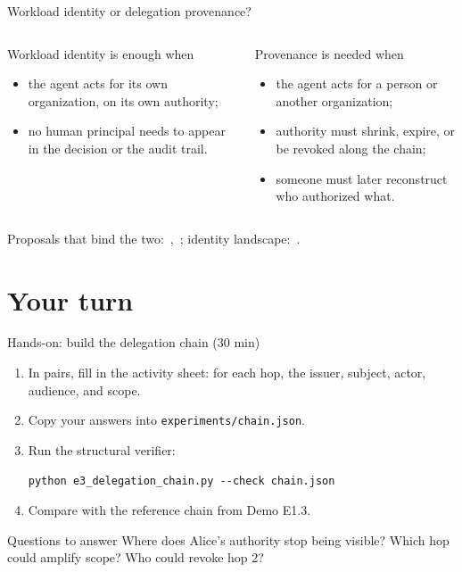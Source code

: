 \documentclass[aspectratio=169, 10pt]{beamer}
\begin{document}
\begin{frame}{Workload identity or delegation provenance?}
  \begin{columns}[T]
    \begin{exampleblock}{Workload identity is enough when}\small
      \begin{itemize}
        \item the agent acts for its own organization, on its own authority;
        \item no human principal needs to appear in the decision or the audit trail.
      \end{itemize}
    \end{exampleblock}
    \begin{alertblock}{Provenance is needed when}\small
      \begin{itemize}
        \item the agent acts for a person or another organization;
        \item authority must shrink, expire, or be revoked along the chain;
        \item someone must later reconstruct who authorized what.
      \end{itemize}
    \end{alertblock}
  \end{columns}
  \vspace{2mm}
  {\small Proposals that bind the two: \,\pre, \,\pre; identity landscape: \,\pre.}
\end{frame}

\section{Your turn}

\begin{frame}[fragile]{Hands-on: build the delegation chain (30 min)}
  \small
  \begin{enumerate}
    \item In pairs, fill in the activity sheet: for each hop, the issuer, subject, actor, audience, and scope.
    \item Copy your answers into \texttt{experiments/chain.json}.
    \item Run the structural verifier:
\begin{verbatim}
python e3_delegation_chain.py --check chain.json
\end{verbatim}
    \item Compare with the reference chain from Demo E1.3.
  \end{enumerate}
  \begin{block}{Questions to answer}\small
    Where does Alice's authority stop being visible? Which hop could amplify scope? Who could revoke hop 2?
  \end{block}
\end{frame}
\end{document}
